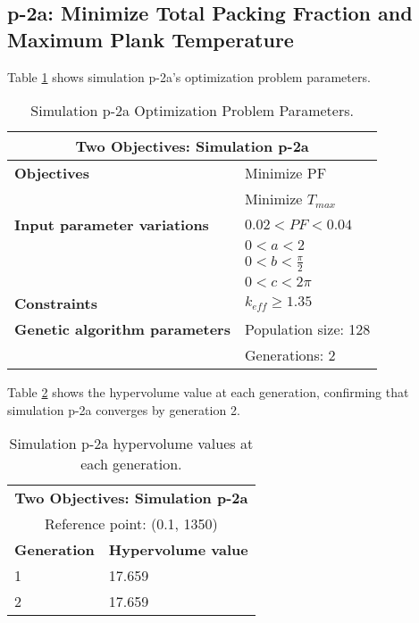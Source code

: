 \subsection{p-2a: Minimize Total Packing Fraction and Maximum Plank Temperature}
\label{sec:p-2a}
Table \ref{tab:simulationp2a} shows simulation p-2a's optimization problem parameters.
 
\begin{table}[htbp!]
    \centering
    \onehalfspacing
    \caption{Simulation p-2a Optimization Problem Parameters.}
	\label{tab:simulationp2a}
    \footnotesize
    \begin{tabular}{l|p{4cm}}
    \hline 
    \multicolumn{2}{c}{\textbf{Two Objectives: Simulation p-2a}} \\
    \hline 
    \textbf{Objectives} & Minimize PF \\
    & Minimize $T_{max}$ \\
    \hline 
    \textbf{Input parameter variations} & $0.02<PF<0.04$ \\
    & $0<a<2$ \\
    & $0<b<\frac{\pi}{2}$ \\
    & $0<c<2\pi$ \\
    \hline
    \textbf{Constraints} & $k_{eff} \geq 1.35$\\ 
    \hline 
    \textbf{Genetic algorithm parameters} & Population size: 128 \\
    & Generations: 2 \\
    \hline
    \end{tabular}
\end{table}

Table \ref{tab:p2a-hypervolume} shows the hypervolume value at each generation, 
confirming that simulation p-2a converges by generation 2. 
\begin{table}[htbp!]
    \centering
    \onehalfspacing
    \caption{Simulation p-2a hypervolume values at each generation.}
	\label{tab:p2a-hypervolume}
    \footnotesize
    \begin{tabular}{ll}
    \hline 
    \multicolumn{2}{c}{\textbf{Two Objectives: Simulation p-2a}} \\
    \multicolumn{2}{c}{Reference point: (0.1, 1350)} \\
    \hline 
    \textbf{Generation} & \textbf{Hypervolume value} \\
    \hline
    1 & 17.659 \\
    2 & 17.659 \\
    \hline
    \end{tabular}
\end{table}

